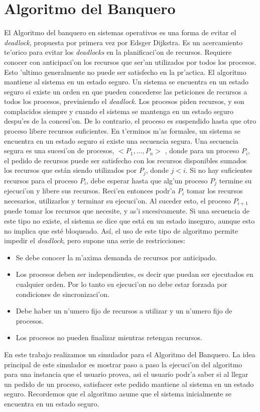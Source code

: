 \section{Algoritmo del Banquero}
El Algoritmo del banquero en sistemas operativos es una forma de evitar el
\emph{deadlock}, propuesta por primera vez por Edsger Dijkstra. Es un
acercamiento te'orico para evitar los \emph{deadlocks} en la planificaci'on de
recursos. Requiere conocer con anticipaci'on los recursos que ser'an utilizados
por todos los procesos. Esto 'ultimo generalmente no puede ser satisfecho en la
pr'actica.
El algoritmo mantiene al sistema en un estado seguro. Un sistema se encuentra
en un estado seguro si existe un orden en que pueden concederse las peticiones
de recursos a todos los procesos, previniendo el \emph{deadlock}.
Los procesos piden recursos, y son complacidos siempre y cuando el sistema se
mantenga en un estado seguro despu'es de la concesi'on. De lo contrario, el
proceso es suspendido hasta que otro proceso libere recursos suficientes.
En t'erminos m'as formales, un sistema se encuentra en un estado seguro si
existe una secuencia segura. Una secuencia segura es una sucesi'on de procesos,
$< P_1,\ldots, P_n >$ , donde para un proceso $P_i$, el pedido de recursos
puede ser satisfecho con los recursos disponibles sumados los recursos que
están siendo utilizados por $P_j$, donde $j < i$. Si no hay suficientes
recursos para el proceso $P_i$, debe esperar hasta que alg'un proceso $P_j$
termine su ejecuci'on y libere sus recursos. Reci'en entonces podr'a $P_i$
tomar los recursos necesarios, utilizarlos y terminar su ejecuci'on. Al suceder
esto, el proceso $P_{i+1}$ puede tomar los recursos que necesite, y as'i
sucesivamente. Si una secuencia de este tipo no existe, el sistema se dice que
está en un estado inseguro, aunque esto no implica que esté bloqueado.
Así, el uso de este tipo de algoritmo permite impedir el \emph{deadlock}, pero
supone una serie de restricciones:
\begin{itemize}
 \item Se debe conocer la m'axima demanda de recursos por anticipado.
 \item Los procesos deben ser independientes, es decir que puedan ser
ejecutados en cualquier orden. Por lo tanto su ejecuci'on no debe estar forzada
por condiciones de sincronizaci'on.
 \item Debe haber un n'umero fijo de recursos a utilizar y un n'umero fijo de
procesos.
 \item Los procesos no pueden finalizar mientras retengan recursos.
\end{itemize}
En este trabajo realizamos un simulador para el Algoritmo del Banquero. La idea
principal de este simulador es mostrar paso a paso la ejecuci'on del algoritmo
para una instancia que el usuario provea, asi el usuario podr'a saber si al 
llegar un pedido de un proceso, satisfacer este pedido mantiene al sistema en
un estado seguro. Recordemos que el algoritmo asume que el sistema inicialmente
se encuentra en un estado seguro.

